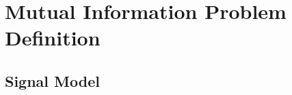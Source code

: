 \documentclass{article}         %
\theoremstyle{definition}
\theoremstyle{remark}
\begin{document}
		
		\section{Mutual Information Problem Definition}\label{MIProblem}
		
		\subsection{Signal Model}
		
\end{document}
